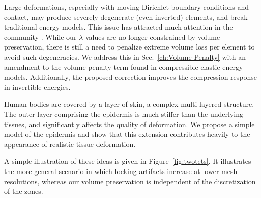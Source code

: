 Large deformations, especially with moving Dirichlet boundary
conditions and contact, may produce severely degenerate (even
inverted) elements, and break traditional energy models. This issue
has attracted much attention in the community \cite{Irving:2007,
	Stomakhin:2012,Smith:2018}.  While our $\lambda$ values are no
longer constrained by volume preservation, there is still a need to
penalize extreme volume loss per element to avoid such degeneracies.
We address this in Sec.~\ref{ch:Volume Penalty} with an amendment to the
volume penalty term found in compressible elastic energy
models. Additionally, the proposed correction improves the compression
response in invertible energies.

Human bodies are covered by a layer of skin, a complex multi-layered structure. The outer layer comprising the epidermis is much stiffer than the underlying tissues, and significantly affects the quality of deformation. We propose a simple model of the epidermis and show that this
extension contributes heavily to the appearance of realistic tissue deformation.


A simple illustration of these ideas is given in
Figure~\ref{fig:twotets}. It illustrates the more general scenario in
which locking artifacts increase at lower mesh resolutions, whereas our
volume preservation is independent of the discretization of the zones.





